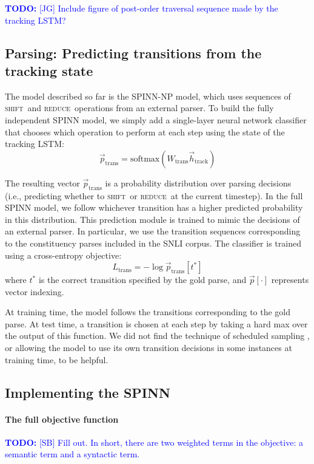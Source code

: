 \documentclass[11pt]{article}
\newcommand\todo[1]{\textcolor{blue}{\textbf{TODO:} #1}}
\newcommand{\shift}{\textsc{shift}}
\newcommand{\reduce}{\textsc{reduce}}
\begin{document}
\todo{[JG] Include figure of post-order traversal sequence made by the tracking LSTM?}

\subsection{Parsing: Predicting transitions from the tracking state}

The model described so far is the SPINN-NP model, which uses sequences of \shift~and \reduce~operations from an external parser. To build the fully independent SPINN model, we simply add a single-layer neural network classifier that chooses which operation to perform at each step using the state of the tracking LSTM:
\begin{equation}
\vec{p}_{\text{trans}} = \text{softmax}(W_{\text{trans}}\vec{h}_{\text{track}})
\end{equation}

The resulting vector $\vec{p}_{\text{trans}}$ is a probability distribution over parsing decisions (i.e., predicting whether to \shift~or \reduce~at the current timestep). In the full SPINN model, we follow whichever transition has a higher predicted probability in this distribution. This prediction module is trained to mimic the decisions of an external parser. In particular, we use the transition sequences corresponding to the constituency parses included in the SNLI corpus. The classifier is trained using a cross-entropy objective:
\begin{equation}
  L_{\text{trans}} = - \log \vec{p}_{\text{trans}}[t^*]
\end{equation}
where $t^*$ is the correct transition specified by the gold parse, and $\vec{p}[\cdot]$ represents vector indexing.

At training time, the model follows the transitions corresponding to the gold parse. At test time, a transition is chosen at each step by taking a hard max over the output of this function. We did not find the technique of scheduled sampling \citep{bengio2015scheduled}, or allowing the model to use its own transition decisions in some instances at training time, to be helpful.

\subsection{Implementing the SPINN}

\paragraph{The full objective function} \todo{[SB] Fill out. In short, there are two weighted terms in the objective: a semantic term and a syntactic term.}
\end{document}
